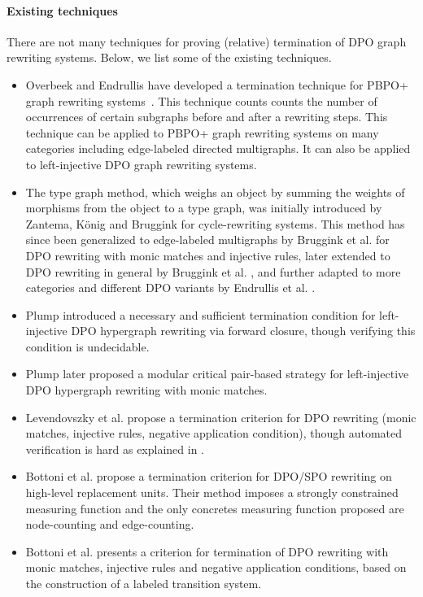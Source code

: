 \paragraph{Existing techniques}
There are not many techniques for proving (relative) termination of DPO graph rewriting systems. Below, we list some of the existing techniques.
 
\begin{itemize}
    \item Overbeek and Endrullis have developed a termination technique for PBPO+ graph rewriting systems~\cite{overbeek2024termination_lmcs}. This technique counts counts the number of occurrences of certain subgraphs before and after a rewriting steps. This technique can be applied to PBPO+ graph rewriting systems on many categories including edge-labeled directed multigraphs. It can also be applied to left-injective DPO graph rewriting systems.
    \item The type graph method, which weighs an object by summing the weights of morphisms from the object to a type graph, was initially introduced by Zantema, K{\"o}nig and Bruggink \cite{zantema2014termination} for cycle-rewriting systems. 
    This method has since been generalized to edge-labeled multigraphs by Bruggink et al. \cite{bruggink2014termination} for DPO rewriting with monic matches and injective rules, later extended to DPO rewriting in general by Bruggink et al. \cite{bruggink2015proving}, and further adapted to more categories and different DPO variants by Endrullis et al. \cite{endrullis2024generalized_arxiv_v2}. 
    \item Plump \cite{plump1995ontermination} introduced a necessary and sufficient termination condition for left-injective DPO hypergraph rewriting via forward closure, though verifying this condition is undecidable. 
    \item Plump \cite{plump2018modular} later proposed a modular critical pair-based strategy for left-injective DPO hypergraph rewriting with monic matches. 
    \item Levendovszky et al. \cite{levendovszky2007termination} propose a termination criterion for DPO rewriting (monic matches, injective rules, negative application condition), though automated verification is hard as explained in \cite[]{levendovszky2007termination}. 
    \item Bottoni et al. \cite{bottoni2005termination} propose a termination criterion for DPO/SPO rewriting on high-level replacement units. Their method imposes a strongly constrained measuring function and the only concretes measuring function proposed are node-counting and edge-counting.
    \item Bottoni et al. \cite{bottoni2010atermination} presents a criterion for termination of DPO rewriting with monic matches, injective rules and negative application conditions, based on the construction of a labeled transition system. 
\end{itemize}


